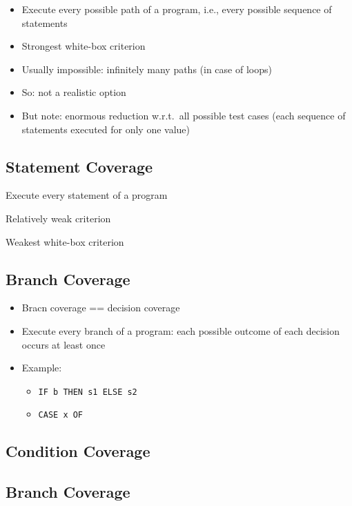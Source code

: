 \begin{itemize}
	\item Execute every possible path of a program, i.e., every possible sequence of statements
	\item Strongest white-box criterion
	\item Usually impossible: infinitely many paths (in case of loops)
	\item So: not a realistic option
	\item But note: enormous reduction w.r.t.\ all possible test cases (each sequence of statements executed for only one value)
\end{itemize}

\subsection{Statement Coverage}

\begin{itemize*}
	\item Execute every statement of a program
	\item Relatively weak criterion
	\item Weakest white-box criterion
\end{itemize*}

\subsection{Branch Coverage}

\begin{itemize}
	\item Bracn coverage == decision coverage
	\item Execute every branch of a program: each possible outcome of each decision occurs at least once
	\item Example:
	\begin{itemize}
		\item \verb|IF b THEN s1 ELSE s2|
		\item \verb|CASE x OF|
	\end{itemize}
\end{itemize}

\subsection{Condition Coverage}

\subsection{Branch Coverage}
